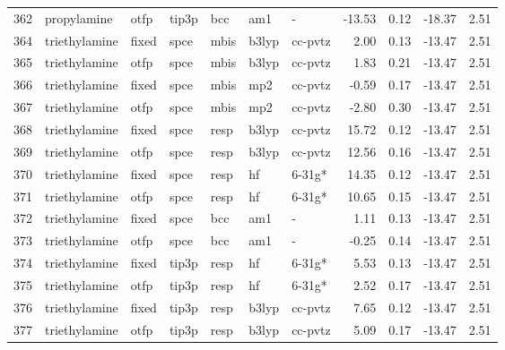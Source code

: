 \begin{tabular}{lllllllrrrr}
362 &                   propylamine &   otfp &  tip3p &    bcc &     am1 &            - &      -13.53 &     0.12 &      -18.37 &      2.51 \\
364 &                 triethylamine &  fixed &   spce &   mbis &   b3lyp &      cc-pvtz &        2.00 &     0.13 &      -13.47 &      2.51 \\
365 &                 triethylamine &   otfp &   spce &   mbis &   b3lyp &      cc-pvtz &        1.83 &     0.21 &      -13.47 &      2.51 \\
366 &                 triethylamine &  fixed &   spce &   mbis &     mp2 &      cc-pvtz &       -0.59 &     0.17 &      -13.47 &      2.51 \\
367 &                 triethylamine &   otfp &   spce &   mbis &     mp2 &      cc-pvtz &       -2.80 &     0.30 &      -13.47 &      2.51 \\
368 &                 triethylamine &  fixed &   spce &   resp &   b3lyp &      cc-pvtz &       15.72 &     0.12 &      -13.47 &      2.51 \\
369 &                 triethylamine &   otfp &   spce &   resp &   b3lyp &      cc-pvtz &       12.56 &     0.16 &      -13.47 &      2.51 \\
370 &                 triethylamine &  fixed &   spce &   resp &      hf &       6-31g* &       14.35 &     0.12 &      -13.47 &      2.51 \\
371 &                 triethylamine &   otfp &   spce &   resp &      hf &       6-31g* &       10.65 &     0.15 &      -13.47 &      2.51 \\
372 &                 triethylamine &  fixed &   spce &    bcc &     am1 &            - &        1.11 &     0.13 &      -13.47 &      2.51 \\
373 &                 triethylamine &   otfp &   spce &    bcc &     am1 &            - &       -0.25 &     0.14 &      -13.47 &      2.51 \\
374 &                 triethylamine &  fixed &  tip3p &   resp &      hf &       6-31g* &        5.53 &     0.13 &      -13.47 &      2.51 \\
375 &                 triethylamine &   otfp &  tip3p &   resp &      hf &       6-31g* &        2.52 &     0.17 &      -13.47 &      2.51 \\
376 &                 triethylamine &  fixed &  tip3p &   resp &   b3lyp &      cc-pvtz &        7.65 &     0.12 &      -13.47 &      2.51 \\
377 &                 triethylamine &   otfp &  tip3p &   resp &   b3lyp &      cc-pvtz &        5.09 &     0.17 &      -13.47 &      2.51 \\

\end{tabular}
